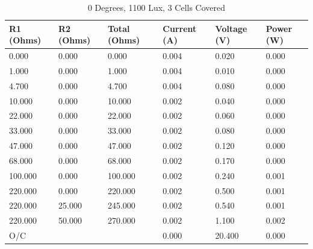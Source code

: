 \documentclass{article}
\begin{document}
		\begin{table}[H]
			\centering
			\caption{0 Degrees, 1100 Lux, 3 Cells Covered}
			\begin{tabular}{|l|l|l|l|l|l|}
				\hline
				
				\textbf{R1 (Ohms)} & \textbf{R2 (Ohms)} & \textbf{Total (Ohms)} & \textbf{Current (A)} & \textbf{Voltage (V)} & \textbf{Power (W)} \\ \hline
				0.000 & 0.000 & 0.000 & 0.004 & 0.020 & 0.000 \\ \hline
				1.000 & 0.000 & 1.000 & 0.004 & 0.010 & 0.000 \\ \hline
				4.700 & 0.000 & 4.700 & 0.004 & 0.080 & 0.000 \\ \hline
				10.000 & 0.000 & 10.000 & 0.002 & 0.040 & 0.000 \\ \hline
				22.000 & 0.000 & 22.000 & 0.002 & 0.060 & 0.000 \\ \hline
				33.000 & 0.000 & 33.000 & 0.002 & 0.080 & 0.000 \\ \hline
				47.000 & 0.000 & 47.000 & 0.002 & 0.120 & 0.000 \\ \hline
				68.000 & 0.000 & 68.000 & 0.002 & 0.170 & 0.000 \\ \hline
				100.000 & 0.000 & 100.000 & 0.002 & 0.240 & 0.001 \\ \hline
				220.000 & 0.000 & 220.000 & 0.002 & 0.500 & 0.001 \\ \hline
				220.000 & 25.000 & 245.000 & 0.002 & 0.540 & 0.001 \\ \hline
				220.000 & 50.000 & 270.000 & 0.002 & 1.100 & 0.002 \\ \hline
				O/C & & & 0.000 & 20.400 & 0.000 \\ \hline
				
			\end{tabular}
		\end{table}
	
\end{document}
